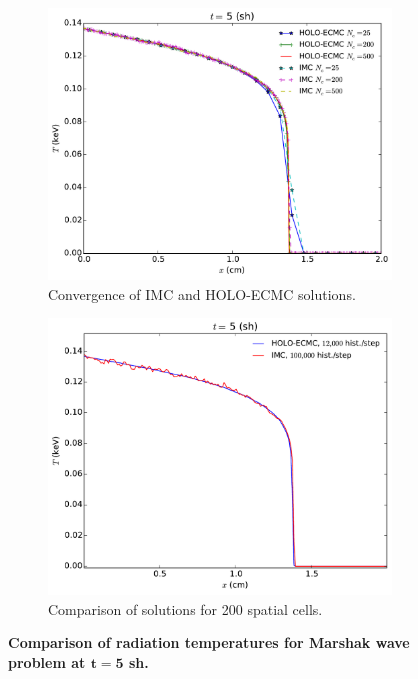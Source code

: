 \documentclass[12pt]{article}
\begin{document}
\begin{center}
\begin{figure}[htb]
    \centering
\begin{subfigure}{0.7\textwidth}
  \centering
    \includegraphics[width=0.99\linewidth]{marshak_mesh_conv.pdf}
    \caption{\label{marshak_mesh_conv} Convergence of IMC and HOLO-ECMC solutions.}
\end{subfigure}
\begin{subfigure}{0.7\textwidth}
  \centering
  \includegraphics[width=0.99\linewidth]{marshak_200_compare.pdf}
  \caption{\label{marshak_200_compare}  Comparison of solutions for 200 spatial cells. }
\end{subfigure}
\caption{\bf Comparison of radiation temperatures for Marshak wave problem at $\mathbf{t=5}$ sh.}
\end{figure}


\end{center}
\end{document}
